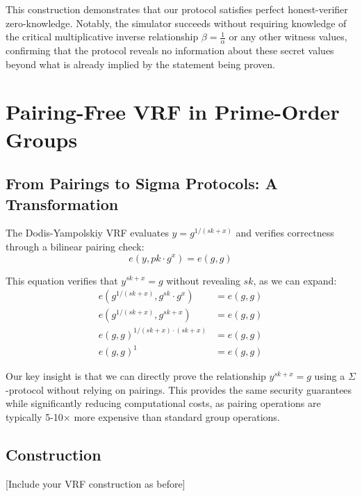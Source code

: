 This construction demonstrates that our protocol satisfies perfect honest-verifier zero-knowledge. Notably, the simulator succeeds without requiring knowledge of the critical multiplicative inverse relationship $\beta = \frac{1}{\alpha}$ or any other witness values, confirming that the protocol reveals no information about these secret values beyond what is already implied by the statement being proven.














\section{Pairing-Free VRF in Prime-Order Groups}

\subsection{From Pairings to Sigma Protocols: A Transformation}

The Dodis-Yampolskiy VRF \cite{hutchison_verifiable_2005} evaluates $y = g^{1/(sk+x)}$ and verifies correctness through a bilinear pairing check:
\begin{equation}
e(y, pk \cdot g^x) = e(g, g)
\end{equation}

This equation verifies that $y^{sk+x} = g$ without revealing $sk$, as we can expand:
\begin{align}
e(g^{1/(sk+x)}, g^{sk} \cdot g^x) &= e(g, g)\\
e(g^{1/(sk+x)}, g^{sk+x}) &= e(g, g)\\
e(g, g)^{1/(sk+x) \cdot (sk+x)} &= e(g, g)\\
e(g, g)^1 &= e(g, g)
\end{align}

Our key insight is that we can directly prove the relationship $y^{sk+x} = g$ using a $\Sigma$-protocol without relying on pairings. This provides the same security guarantees while significantly reducing computational costs, as pairing operations are typically 5-10× more expensive than standard group operations.

\subsection{Construction}
[Include your VRF construction as before]

